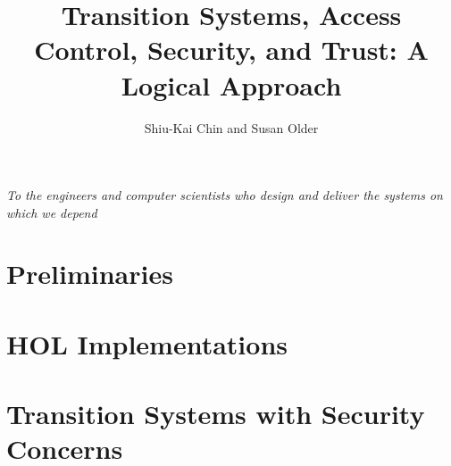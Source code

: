 \documentclass[final]{our-book}
\newcounter{count} \newcounter{restart}
\begin{document}



\title{Transition Systems, Access Control, Security, and Trust: A
  Logical Approach%
}

\author{Shiu-Kai Chin and Susan Older}

\maketitle


\frontmatter
\thispagestyle{empty}

\begin{center}
  \textit{To the engineers and computer scientists who design and
    deliver the systems on which we depend} \\
\end{center}

\clearpage


\setcounter{page}{6}

\tableofcontents
\listoftables
\listoffigures



\mainmatter


\part{Preliminaries}





\part{HOL Implementations}

\part{Transition Systems with Security Concerns}


\appendix



\cleardoublepage
{}



\end{document}
